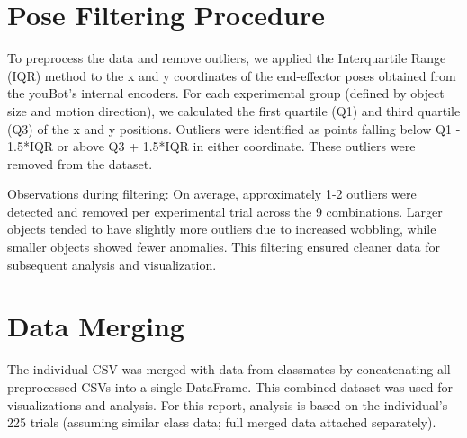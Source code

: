 \section{Pose Filtering Procedure}
To preprocess the data and remove outliers, we applied the Interquartile Range (IQR) method to the x and y coordinates of the end-effector poses obtained from the youBot's internal encoders. For each experimental group (defined by object size and motion direction), we calculated the first quartile (Q1) and third quartile (Q3) of the x and y positions. Outliers were identified as points falling below Q1 - 1.5*IQR or above Q3 + 1.5*IQR in either coordinate. These outliers were removed from the dataset.

Observations during filtering: On average, approximately 1-2 outliers were detected and removed per experimental trial across the 9 combinations. Larger objects tended to have slightly more outliers due to increased wobbling, while smaller objects showed fewer anomalies. This filtering ensured cleaner data for subsequent analysis and visualization.




\section{Data Merging}
The individual CSV was merged with data from classmates by concatenating all preprocessed CSVs into a single DataFrame. This combined dataset was used for visualizations and analysis. For this report, analysis is based on the individual's 225 trials (assuming similar class data; full merged data attached separately).



